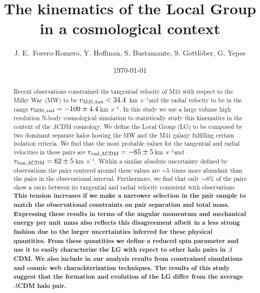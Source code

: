 \documentclass{emulateapj}
\newcommand{\kms}{\,km~s$^{-1}$}
\begin{document}
\title{The kinematics of the Local Group in a cosmological context}
\author{
J. E.\ Forero-Romero, 
Y. Hoffman, 
S.  Bustamante, 
S. Gottl\"ober, 
G. Yepes
}


\date{\today}

\begin{abstract}
   
Recent observations constrained the tangential velocity of M31 with respect to the Milky Way (MW) to be $v_{\rm M31,tan}<34.4$ \kms and the radial velocity to be in the range $v_{\rm M31,rad}=-109\pm 4.4$\kms \citep{vanderMarel12}. In this study we use a large volume high resolution N-body cosmological simulation to statistically study this kinematics in the context of the $\Lambda$CDM cosmology. We define the Local Group (LG) to be composed by two dominant separate halos hosting the MW and the M31 galaxy fulfilling certain isolation criteria. We find that the most probable values for the tangential and radial velocities in these pairs are $v_{\rm rad, \Lambda CDM}=-65\pm 5$\kms and $v_{\rm tan, \Lambda CDM}=62\pm 5$\kms. Within a similar absolute uncertainty defined by observations the pairs centered around these values are $\sim5$ times more abundant than the pairs in the observational interval. Furthermore, we find that only $\sim8\%$ of the pairs show a ratio between its tangential and radial velocity consistent with observations. {\bf This tension increases if we make a narrower selection in the pair sample to match the observational constraints on pair separation and total mass. Expressing these results in terms of the angular momentum and mechanical energy per unit mass also reflects this disagreement albeit in a less strong fashion due to the larger uncertainties inferred for these physical quantities. From these quantities we define a reduced spin parameter and use it to easily characterize the LG with repect to other halo pairs in $\Lambda$CDM. We also include in our analysis results from constrained simulations and cosmic web charachterization techniques. The results of this study suggest that the formation and evolution of the LG differ from the average $\Lambda$CDM halo pair.}
\end{abstract}
\end{document}
